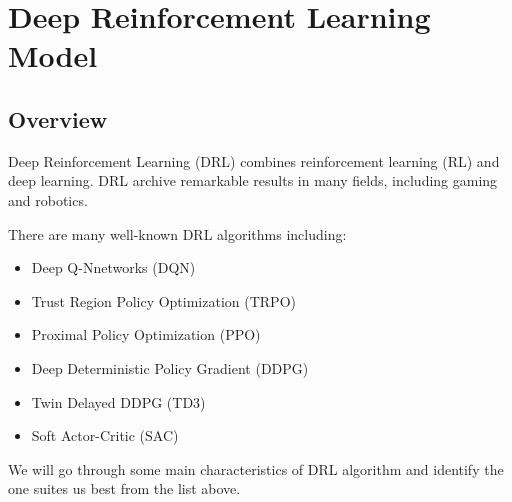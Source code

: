 \chapter{Deep Reinforcement Learning Model}
\label{c:drl}
\section{Overview}
Deep Reinforcement Learning (DRL) combines reinforcement learning (RL) and deep learning. DRL archive remarkable results in many fields, including gaming\cite{mnih2013playing} and robotics\cite{levine2016end}. 
\par 
There are many well-known DRL algorithms including: 
\begin{itemize}
    \item Deep Q-Nnetworks (DQN) \cite{mnih2013playing}
    \item Trust Region Policy Optimization (TRPO) \cite{schulman2015trust}
    \item Proximal Policy Optimization (PPO) \cite{schulman2017proximal}
    \item Deep Deterministic Policy Gradient (DDPG) \cite{silver2014deterministic}
    \item Twin Delayed DDPG (TD3) \cite{fujimoto2018addressing}
    \item Soft Actor-Critic (SAC) \cite{haarnoja2018soft} 
\end{itemize}

We will go through some main characteristics of DRL algorithm and identify the one suites us best from the list above.


